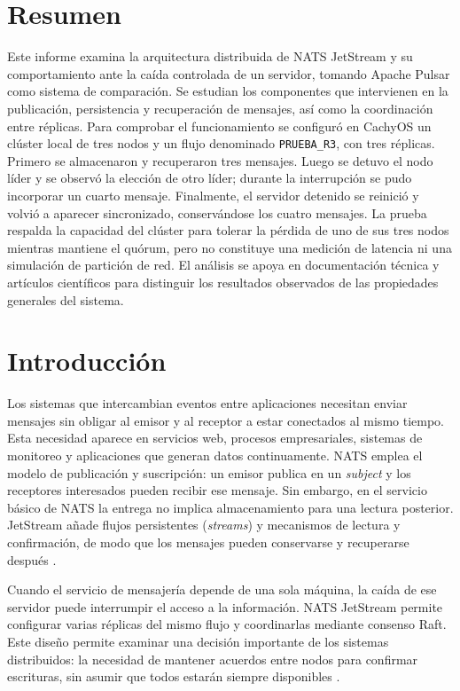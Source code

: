 \documentclass[12pt,a4paper]{article}
\begin{document}
\clearpage
{}
\section*{Resumen}
Este informe examina la arquitectura distribuida de NATS JetStream y su comportamiento ante la caída controlada de un servidor, tomando Apache Pulsar como sistema de comparación. Se estudian los componentes que intervienen en la publicación, persistencia y recuperación de mensajes, así como la coordinación entre réplicas. Para comprobar el funcionamiento se configuró en CachyOS un clúster local de tres nodos y un flujo denominado \texttt{PRUEBA\_R3}, con tres réplicas. Primero se almacenaron y recuperaron tres mensajes. Luego se detuvo el nodo líder y se observó la elección de otro líder; durante la interrupción se pudo incorporar un cuarto mensaje. Finalmente, el servidor detenido se reinició y volvió a aparecer sincronizado, conservándose los cuatro mensajes. La prueba respalda la capacidad del clúster para tolerar la pérdida de uno de sus tres nodos mientras mantiene el quórum, pero no constituye una medición de latencia ni una simulación de partición de red. El análisis se apoya en documentación técnica y artículos científicos para distinguir los resultados observados de las propiedades generales del sistema.

\section{Introducción}
Los sistemas que intercambian eventos entre aplicaciones necesitan enviar mensajes sin obligar al emisor y al receptor a estar conectados al mismo tiempo. Esta necesidad aparece en servicios web, procesos empresariales, sistemas de monitoreo y aplicaciones que generan datos continuamente. NATS emplea el modelo de publicación y suscripción: un emisor publica en un \emph{subject} y los receptores interesados pueden recibir ese mensaje. Sin embargo, en el servicio básico de NATS la entrega no implica almacenamiento para una lectura posterior. JetStream añade flujos persistentes (\emph{streams}) y mecanismos de lectura y confirmación, de modo que los mensajes pueden conservarse y recuperarse después \cite{natsjetstream}.

Cuando el servicio de mensajería depende de una sola máquina, la caída de ese servidor puede interrumpir el acceso a la información. NATS JetStream permite configurar varias réplicas del mismo flujo y coordinarlas mediante consenso Raft. Este diseño permite examinar una decisión importante de los sistemas distribuidos: la necesidad de mantener acuerdos entre nodos para confirmar escrituras, sin asumir que todos estarán siempre disponibles \cite{natsclustering}.
\end{document}
